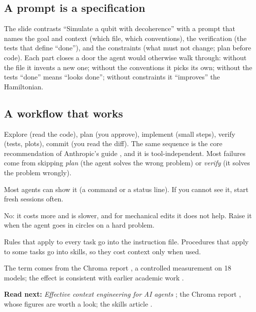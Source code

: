 \subsection{A prompt is a specification}

The slide contrasts ``Simulate a qubit with decoherence'' with a prompt that names the
goal and context (which file, which conventions), the verification (the tests that define
``done''), and the constraints (what must not change; plan before code). Each part closes
a door the agent would otherwise walk through: without the file it invents a new one;
without the conventions it picks its own; without the tests ``done'' means ``looks
done''; without constraints it ``improves'' the Hamiltonian.

\subsection{A workflow that works}

Explore (read the code), plan (you approve), implement (small steps), verify (tests,
plots), commit (you read the diff). The same sequence is the core recommendation of
Anthropic's guide , and it is tool-independent. Most failures come from
skipping \emph{plan} (the agent solves the wrong problem) or \emph{verify} (it solves the
problem wrongly).

\begin{qa}
Most agents can show it (a command or a status line). If you cannot see it, start fresh
sessions often.

No: it costs more and is slower, and for mechanical edits it does not help. Raise it when
the agent goes in circles on a hard problem.

Rules that apply to every task go into the instruction file. Procedures that apply to
some tasks go into skills, so they cost context only when used.

The term comes from the Chroma report , a controlled measurement on 18
models; the effect is consistent with earlier academic work .
\end{qa}

\textbf{Read next:} \emph{Effective context engineering for AI agents} ;
the Chroma report , whose figures are worth a look; the skills article
.
